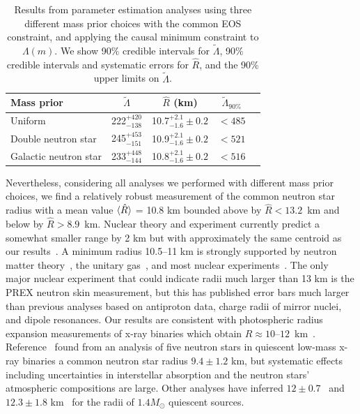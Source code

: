 \begin{table}[t]\label{tab:parameters}
\setlength{\tabcolsep}{3.8pt}
\centering\begin{tabular}{lcccc} 
\hline
\rule{0pt}{3ex}%
Mass prior \quad & \quad $\tilde{\Lambda}$ \quad & \quad $\hat{R}$ (km) \quad & \quad $\tilde{\Lambda}_{90\%}$\quad \\\hline
\rule{0pt}{3ex}%
Uniform & 222$^{+420}_{-138}$ & 10.7$^{+2.1}_{-1.6}\pm 0.2$ & $< 485$\\
Double neutron star & 245$^{+453}_{-151}$ & 10.9$^{+2.1}_{-1.6}\pm 0.2$ & $< 521$ \\
Galactic neutron star & 
233$^{+448}_{-144}$ & 10.8$^{+2.1}_{-1.6}\pm 0.2$ & $< 516$ \\
\hline
\end{tabular}
\caption{Results from parameter estimation analyses using three different mass prior choices with the common EOS constraint, and applying the causal minimum constraint to $\Lambda(m)$. We show 90$\%$ credible intervals for $\tilde{\Lambda}$, 90$\%$ credible intervals and systematic errors for $\hat{R}$, and the 90\% upper limits on $\tilde\Lambda$.%
\vspace*{-0.5cm}%
}
\label{tab:summary_table}
\end{table}
Nevertheless, considering all analyses we performed with different mass prior choices, we find a relatively robust measurement of the common neutron star radius with a mean value $\langle \large \hat R \rangle$ = 10.8 km bounded above by $\hat R < 13.2$~km and below by $\hat R > 8.9$~km. Nuclear theory and experiment currently predict a somewhat smaller range by 2 km but with approximately the same centroid as our results~\cite{Lattimer:2012nd,Lattimer:2012xj}. A minimum radius 10.5--11 km is strongly supported by neutron matter theory~\cite{Gandolfi:2011xu,Lynn:2015jua,Drischler:2015eba}, the unitary gas~\cite{Kolomeitsev:2016sjl}, and most nuclear experiments~\cite{Lattimer:2012nd,Lattimer:2012xj,Tews:2012fj}. The only major nuclear experiment that could indicate radii much larger than 13 km is the PREX neutron skin measurement, but this has published error bars much larger than previous analyses based on antiproton data, charge radii of mirror nuclei, and dipole resonances. 
Our results are consistent with photospheric radius expansion measurements of x-ray binaries which obtain $R \approx 10$--$12$~km~\cite{Ozel:2016oaf,Steiner:2010fz,Degenaar:2018lle}. Reference~\cite{Guillot:2014lla} found from an analysis of five neutron stars in quiescent low-mass x-ray binaries a common neutron star radius $9.4\pm1.2$ km, but systematic effects including uncertainties in interstellar absorption and the neutron stars' atmospheric compositions are large. Other analyses have inferred $12\pm0.7$~\cite{Lattimer:2013hma} and $12.3\pm1.8$ km~\cite{Shaw:2018wxh} for the radii of $1.4M_\odot$ quiescent sources. 

